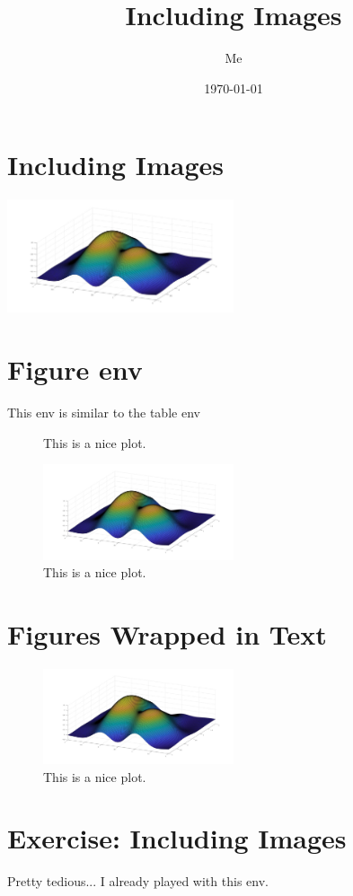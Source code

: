 \documentclass[12pt, titlepage]{article}
\title{Including Images}
\author{Me}
\date{\today}
\begin{document}
\maketitle

\newpage
\tableofcontents
\newpage

\section{Including Images}
\includegraphics[width = 0.5\textwidth]{plot.jpg}

\section{Figure env}
This env is similar to the table env
\begin{figure}[h]
    \centering
    \caption{This is a nice plot.}
    \includegraphics[width = 0.5\textwidth]{plot.jpg}
    \caption{This is a nice plot.}
\end{figure}

\newpage
\listoffigures
\listoftables

\section{Figures Wrapped in Text}
\begin{figure} %
    \includegraphics[width = 0.5\textwidth]{plot.jpg}
    \caption{This is a nice plot.}
\end{figure}
\blindtext

\newpage
\section{Exercise: Including Images}
Pretty tedious... I already played with this env.
\end{document}
